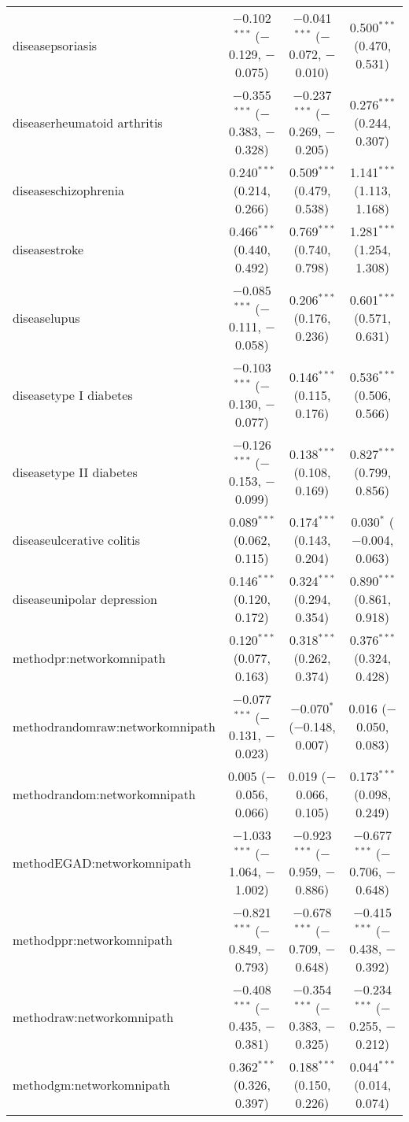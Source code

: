 \begin{table}[!htbp]
\begin{tabular}{@{\extracolsep{5pt}}lccc}
  diseasepsoriasis & $-$0.102$^{***}$ ($-$0.129, $-$0.075) & $-$0.041$^{***}$ ($-$0.072, $-$0.010) & 0.500$^{***}$ (0.470, 0.531) \\ 
  diseaserheumatoid arthritis & $-$0.355$^{***}$ ($-$0.383, $-$0.328) & $-$0.237$^{***}$ ($-$0.269, $-$0.205) & 0.276$^{***}$ (0.244, 0.307) \\ 
  diseaseschizophrenia & 0.240$^{***}$ (0.214, 0.266) & 0.509$^{***}$ (0.479, 0.538) & 1.141$^{***}$ (1.113, 1.168) \\ 
  diseasestroke & 0.466$^{***}$ (0.440, 0.492) & 0.769$^{***}$ (0.740, 0.798) & 1.281$^{***}$ (1.254, 1.308) \\ 
  diseaselupus & $-$0.085$^{***}$ ($-$0.111, $-$0.058) & 0.206$^{***}$ (0.176, 0.236) & 0.601$^{***}$ (0.571, 0.631) \\ 
  diseasetype I diabetes & $-$0.103$^{***}$ ($-$0.130, $-$0.077) & 0.146$^{***}$ (0.115, 0.176) & 0.536$^{***}$ (0.506, 0.566) \\ 
  diseasetype II diabetes & $-$0.126$^{***}$ ($-$0.153, $-$0.099) & 0.138$^{***}$ (0.108, 0.169) & 0.827$^{***}$ (0.799, 0.856) \\ 
  diseaseulcerative colitis & 0.089$^{***}$ (0.062, 0.115) & 0.174$^{***}$ (0.143, 0.204) & 0.030$^{*}$ ($-$0.004, 0.063) \\ 
  diseaseunipolar depression & 0.146$^{***}$ (0.120, 0.172) & 0.324$^{***}$ (0.294, 0.354) & 0.890$^{***}$ (0.861, 0.918) \\ 
  methodpr:networkomnipath & 0.120$^{***}$ (0.077, 0.163) & 0.318$^{***}$ (0.262, 0.374) & 0.376$^{***}$ (0.324, 0.428) \\ 
  methodrandomraw:networkomnipath & $-$0.077$^{***}$ ($-$0.131, $-$0.023) & $-$0.070$^{*}$ ($-$0.148, 0.007) & 0.016 ($-$0.050, 0.083) \\ 
  methodrandom:networkomnipath & 0.005 ($-$0.056, 0.066) & 0.019 ($-$0.066, 0.105) & 0.173$^{***}$ (0.098, 0.249) \\ 
  methodEGAD:networkomnipath & $-$1.033$^{***}$ ($-$1.064, $-$1.002) & $-$0.923$^{***}$ ($-$0.959, $-$0.886) & $-$0.677$^{***}$ ($-$0.706, $-$0.648) \\ 
  methodppr:networkomnipath & $-$0.821$^{***}$ ($-$0.849, $-$0.793) & $-$0.678$^{***}$ ($-$0.709, $-$0.648) & $-$0.415$^{***}$ ($-$0.438, $-$0.392) \\ 
  methodraw:networkomnipath & $-$0.408$^{***}$ ($-$0.435, $-$0.381) & $-$0.354$^{***}$ ($-$0.383, $-$0.325) & $-$0.234$^{***}$ ($-$0.255, $-$0.212) \\ 
  methodgm:networkomnipath & 0.362$^{***}$ (0.326, 0.397) & 0.188$^{***}$ (0.150, 0.226) & 0.044$^{***}$ (0.014, 0.074) \\ 

\end{tabular}
\end{table}

